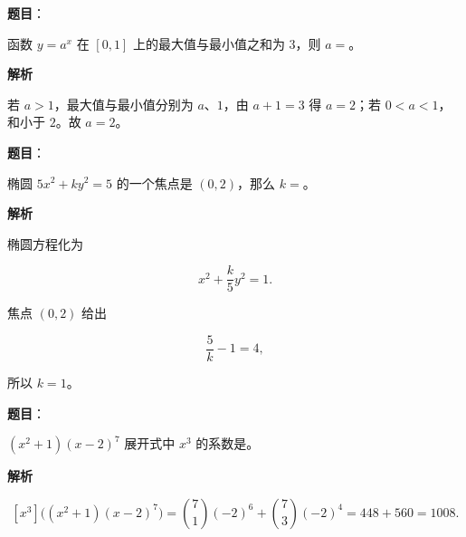 \begin{answer}

\textbf{题目}：

函数 $y=a^x$ 在 $[0,1]$ 上的最大值与最小值之和为 $3$，则 $a=$\gkblank{}。

\textbf{解析}

若 $a>1$，最大值与最小值分别为 $a\text{、}1$，由 $a+1=3$ 得 $a=2$；若 $0<a<1$，和小于 $2$。故 $a=2$。


\end{answer}
\begin{answer}

\textbf{题目}：

椭圆 $5x^2+ky^2=5$ 的一个焦点是 $(0,2)$，那么 $k=$\gkblank{}。

\textbf{解析}

椭圆方程化为

\nopagebreak[4]
\[
x^2+\frac{k}{5}y^2=1.
\]

焦点 $(0,2)$ 给出

\nopagebreak[4]
\[
\frac5k-1=4,
\]

所以 $k=1$。


\end{answer}
\begin{answer}

\textbf{题目}：

$(x^2+1)(x-2)^7$ 展开式中 $x^3$ 的系数是\gkblank{}。

\textbf{解析}

\nopagebreak[4]
\[
[x^3]\bigl((x^2+1)(x-2)^7\bigr)
=\binom71(-2)^6+\binom73(-2)^4
=448+560=1008.
\]


\end{answer}
